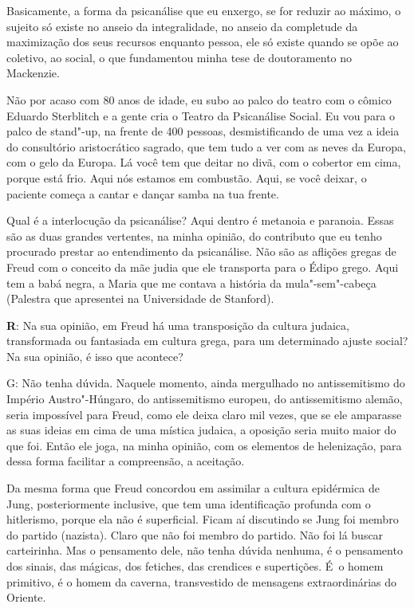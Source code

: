  

Basicamente, a forma da psicanálise que eu enxergo, se for reduzir ao
máximo, o sujeito só existe no anseio da integralidade, no anseio da
completude da maximização dos seus recursos enquanto pessoa, ele só
existe quando se opõe ao coletivo, ao social, o que fundamentou minha
tese de doutoramento no Mackenzie.

 

Não por acaso com 80 anos de idade, eu subo ao palco do teatro com o
cômico Eduardo Sterblitch e a gente cria o Teatro da Psicanálise Social.
Eu vou para o palco de stand"-up, na frente de 400 pessoas, desmistificando
de uma vez a ideia do consultório aristocrático sagrado, que tem tudo a
ver com as neves da Europa, com o gelo da Europa. Lá você tem que deitar
no divã, com o cobertor em cima, porque está frio. Aqui nós estamos em
combustão. Aqui, se você deixar, o paciente começa a cantar e dançar
samba na tua frente.

 

Qual é a interlocução da psicanálise? Aqui dentro é metanoia e paranoia.
Essas são as duas grandes vertentes, na minha opinião, do contributo que
eu tenho procurado prestar ao entendimento da psicanálise. Não são as
aflições gregas de Freud com o conceito da mãe judia que ele transporta
para o Édipo grego. Aqui tem a babá negra, a Maria que me contava a
história da mula"-sem"-cabeça (Palestra que apresentei na Universidade de
Stanford).

 

\textbf{R}: Na sua opinião, em Freud há uma transposição da cultura
judaica, transformada ou fantasiada em cultura grega, para um
determinado ajuste social? Na sua opinião, é isso que acontece?

 

G: Não tenha dúvida. Naquele momento, ainda mergulhado no antissemitismo
do Império Austro"-Húngaro, do antissemitismo europeu, do antissemitismo
alemão, seria impossível para Freud, como ele deixa claro mil vezes, que
se ele amparasse as suas ideias em cima de uma mística judaica, a oposição seria muito maior do que foi. Então ele joga, na minha opinião,
com os elementos de helenização, para dessa forma facilitar a
compreensão, a aceitação.

 

Da mesma forma que Freud concordou em assimilar a cultura epidérmica de
Jung, posteriormente inclusive, que tem uma identificação profunda com o
hitlerismo, porque ela não é superficial. Ficam aí discutindo se Jung
foi membro do partido (nazista). Claro que não foi membro do partido.
Não foi lá buscar carteirinha. Mas o pensamento dele, não tenha dúvida
nenhuma, é o pensamento dos sinais, das mágicas, dos fetiches, das
crendices e supertições. É~o homem primitivo, é o homem da caverna,
transvestido de mensagens extraordinárias do Oriente.

